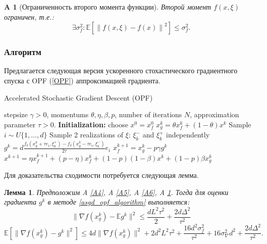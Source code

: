 \documentclass{article}
\newtheorem{lemma}{Лемма}
\newtheorem{assumption}{A}
\begin{document}
\begin{assumption}[Ограниченность второго момента функции]\label{A7}
Второй момент $f(x, \xi)$ ограничен, т.е.:
\begin{equation}
    \exists \sigma_f^2: \mathbb{E}\left[\left\|f(x, \xi) - f(x)\right\|^2\right] \leqslant \sigma_f^2.
    \label{bounded_second_moment_f}
\end{equation}
\end{assumption}

\subsubsection{Алгоритм}
Предлагается следующая версия ускоренного стохастического градиентного спуска с OPF (\ref{OPF}) аппроксимацией градиента.
\begin{algorithm}[!ht]
\caption{ Accelerated Stochastic Gradient Descent (OPF) }\label{asgd_opf_algorithm}
\begin{algorithmic}[1]
   \REQUIRE stepsize $\gamma > 0$, momentums $\theta, \eta, \beta, p$, number of iterations $N$, approximation parameter $\tau > 0$.
   \textbf{Initialization:} choose $x^0 = x_f^0$
		\STATE $x_g^k = \theta x_f^k + (1 - \theta)x^k$
		\STATE Sample $i \sim U\{1, \dots, d\}$
        \STATE Sample 2 realizations of $\xi$: $\xi^-_k$ and $\xi^+_k$ independently
		\STATE $g^k = d\frac{f_\delta(x_g^k + \tau e_i, \xi^+_k) - f_\delta(x_g^k - \tau e_i, \xi^-_k)}{2\tau}e_i$
		\STATE $x_f^{k + 1} = x_g^k - p \gamma g^k$
		\STATE $x^{k + 1} = \eta x_f^{k + 1} + (p - \eta) x_f^k + (1 - p)(1 - \beta) x^k + (1 - p)\beta x_g^k$
   \ENDFOR
\end{algorithmic}
\end{algorithm}

Для доказательства сходимости потребуется следующая лемма.
\begin{lemma}\label{lemma2}
Предположим A \ref{A4}, A \ref{A5}, A \ref{A6}, A \ref{A7}. Тогда для оценки градиента $g^k$ в методе \ref{asgd_opf_algorithm} выполняется:
 \begin{equation}
  \|\nabla f(x_g^k) - \mathbb{E}g^k\|^2 \leqslant \frac{d L^2 \tau^2}{2} + \frac{2d\Delta^2}{\tau^2}
  \label{norm_of_expectation_stochastic_opf}
 \end{equation}
 \begin{equation}
  \mathbb{E}[\|\nabla f(x_g^k) - g^k\|^2] \leqslant 4d \|\nabla f(x_g^k)\|^2 + 2 d^2 L^2 \tau^2 + \frac{16 d^2 \sigma_f^2}{\tau^2} + 16 \sigma_\nabla^2 d^2 + \frac{2d \Delta^2}{\tau^2}.
  \label{expectation_of_norm_stochastic_opf}
 \end{equation}
\end{lemma}
\end{document}

